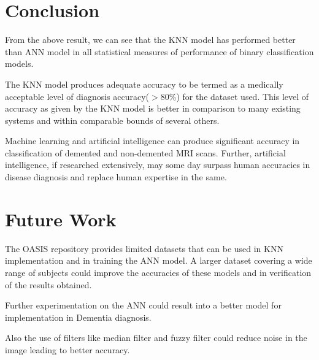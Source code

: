 \documentclass[journal,twoside]{IEEEtran}
\begin{document}
\section{Conclusion}
From the above result, we can see that the KNN model has performed better than ANN model in all statistical measures of performance of binary classification models.
\par The KNN model produces adequate accuracy to be termed as a medically acceptable level of diagnosis accuracy($>$80\%) for the dataset used. This level of accuracy as given by the KNN model is better in comparison to many existing systems and within comparable bounds of several others.
\par Machine learning and artificial intelligence can produce significant accuracy in classification of demented and non-demented MRI scans. Further, artificial intelligence, if researched extensively, may some day surpass human accuracies in disease diagnosis and replace human expertise in the same.

\section{Future Work}
The OASIS repository provides limited datasets that can be used in KNN implementation and in training the ANN model. A larger dataset covering a wide range of subjects could improve the accuracies of these models and in verification of the results obtained. 
\par Further experimentation on the ANN could result into a better model for implementation in Dementia diagnosis.
\par Also the use of filters like median filter and fuzzy filter could reduce noise in the image leading to better accuracy.

%
%
\end{document}
